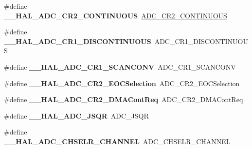 \begin{DoxyCompactItemize}
\item 
\hypertarget{group___h_a_l___a_d_c___aliased___macros_ga8b8d36727b15f9d630f633e453c8dc59}{\#define {\bfseries \-\_\-\-\_\-\-H\-A\-L\-\_\-\-A\-D\-C\-\_\-\-C\-R2\-\_\-\-C\-O\-N\-T\-I\-N\-U\-O\-U\-S}~\hyperlink{group___a_d_c___private___macros_gae92924f248b2fd7693ce648275a8087c}{A\-D\-C\-\_\-\-C\-R2\-\_\-\-C\-O\-N\-T\-I\-N\-U\-O\-U\-S}}\label{group___h_a_l___a_d_c___aliased___macros_ga8b8d36727b15f9d630f633e453c8dc59}

\item 
\hypertarget{group___h_a_l___a_d_c___aliased___macros_ga0906f1443571a5dc173f0a1561f514f4}{\#define {\bfseries \-\_\-\-\_\-\-H\-A\-L\-\_\-\-A\-D\-C\-\_\-\-C\-R1\-\_\-\-D\-I\-S\-C\-O\-N\-T\-I\-N\-U\-O\-U\-S}~A\-D\-C\-\_\-\-C\-R1\-\_\-\-D\-I\-S\-C\-O\-N\-T\-I\-N\-U\-O\-U\-S}\label{group___h_a_l___a_d_c___aliased___macros_ga0906f1443571a5dc173f0a1561f514f4}

\item 
\hypertarget{group___h_a_l___a_d_c___aliased___macros_ga92d473f3afb5552b6e4a710410fcb2f1}{\#define {\bfseries \-\_\-\-\_\-\-H\-A\-L\-\_\-\-A\-D\-C\-\_\-\-C\-R1\-\_\-\-S\-C\-A\-N\-C\-O\-N\-V}~A\-D\-C\-\_\-\-C\-R1\-\_\-\-S\-C\-A\-N\-C\-O\-N\-V}\label{group___h_a_l___a_d_c___aliased___macros_ga92d473f3afb5552b6e4a710410fcb2f1}

\item 
\hypertarget{group___h_a_l___a_d_c___aliased___macros_gafb4baec5d5d5ebf891a3cd8a9a0bfe65}{\#define {\bfseries \-\_\-\-\_\-\-H\-A\-L\-\_\-\-A\-D\-C\-\_\-\-C\-R2\-\_\-\-E\-O\-C\-Selection}~A\-D\-C\-\_\-\-C\-R2\-\_\-\-E\-O\-C\-Selection}\label{group___h_a_l___a_d_c___aliased___macros_gafb4baec5d5d5ebf891a3cd8a9a0bfe65}

\item 
\hypertarget{group___h_a_l___a_d_c___aliased___macros_gaedcab24fbd762b1f6b65c7381f910308}{\#define {\bfseries \-\_\-\-\_\-\-H\-A\-L\-\_\-\-A\-D\-C\-\_\-\-C\-R2\-\_\-\-D\-M\-A\-Cont\-Req}~A\-D\-C\-\_\-\-C\-R2\-\_\-\-D\-M\-A\-Cont\-Req}\label{group___h_a_l___a_d_c___aliased___macros_gaedcab24fbd762b1f6b65c7381f910308}

\item 
\hypertarget{group___h_a_l___a_d_c___aliased___macros_ga920c922d2385fcaab11b2ca7c8630da8}{\#define {\bfseries \-\_\-\-\_\-\-H\-A\-L\-\_\-\-A\-D\-C\-\_\-\-J\-S\-Q\-R}~A\-D\-C\-\_\-\-J\-S\-Q\-R}\label{group___h_a_l___a_d_c___aliased___macros_ga920c922d2385fcaab11b2ca7c8630da8}

\item 
\hypertarget{group___h_a_l___a_d_c___aliased___macros_gae5547f083abe059cacdcaac3e5066ea2}{\#define {\bfseries \-\_\-\-\_\-\-H\-A\-L\-\_\-\-A\-D\-C\-\_\-\-C\-H\-S\-E\-L\-R\-\_\-\-C\-H\-A\-N\-N\-E\-L}~A\-D\-C\-\_\-\-C\-H\-S\-E\-L\-R\-\_\-\-C\-H\-A\-N\-N\-E\-L}\label{group___h_a_l___a_d_c___aliased___macros_gae5547f083abe059cacdcaac3e5066ea2}


\end{DoxyCompactItemize}
